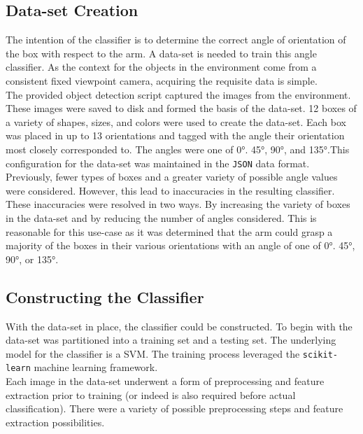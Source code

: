 \documentclass[letterpaper, 10 pt, conference]{conf/ieeeconf}  %
\begin{document}
\subsection{Data-set Creation} %

The intention of the classifier is to determine the correct angle of orientation
of the box with respect to the arm. A data-set is needed to train this angle
classifier. As the context for the objects in the environment come from a
consistent fixed viewpoint camera, acquiring the requisite data is simple.\\

The provided object detection script captured the images from the environment.
These images were saved to disk and formed the basis of the data-set. 12 boxes
of a variety of shapes, sizes, and colors were used to create the data-set. Each
box was placed in up to 13 orientations and tagged with the angle their
orientation most closely corresponded to. The angles were one of \ang{0}.
\ang{45}, \ang{90}, and \ang{135}.This configuration for the data-set was
maintained in the \texttt{JSON} data format.\\

Previously, fewer types of boxes and a greater variety of possible angle values
were considered. However, this lead to inaccuracies in the resulting classifier.
These inaccuracies were resolved in two ways. By increasing the variety of boxes
in the data-set and by reducing the number of angles considered. This is
reasonable for this use-case as it was determined that the arm could grasp a
majority of the boxes in their various orientations with an angle of one of
\ang{0}. \ang{45}, \ang{90}, or \ang{135}.\\

\subsection{Constructing the Classifier} %
With the data-set in place, the classifier could be constructed. To begin with
the data-set was partitioned into a training set and a testing set. The
underlying model for the classifier is a SVM. The training process leveraged the
\texttt{scikit-learn} machine learning framework.\\

Each image in the data-set underwent a form of preprocessing and feature
extraction prior to training (or indeed is also required before actual
classification). There were a variety of possible preprocessing steps and
feature extraction possibilities.\\
\end{document}

